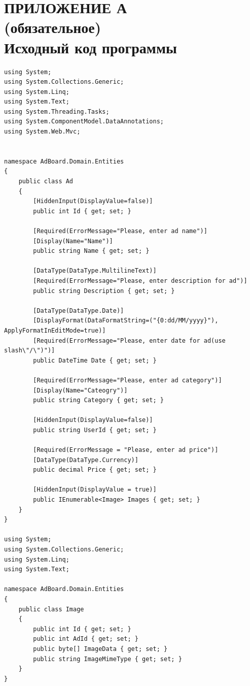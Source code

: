 \documentclass[14pt,a4paper]{extreport}
\begin{document}
	\lstset{style=sharpc}

	\newpage
	\section*{\center\normalsize ПРИЛОЖЕНИЕ А\\(обязательное)\\Исходный код программы \endcenter}
	\begin{lstlisting}
using System;
using System.Collections.Generic;
using System.Linq;
using System.Text;
using System.Threading.Tasks;
using System.ComponentModel.DataAnnotations;
using System.Web.Mvc;


namespace AdBoard.Domain.Entities
{
    public class Ad
    {
        [HiddenInput(DisplayValue=false)]
        public int Id { get; set; }
        
        [Required(ErrorMessage="Please, enter ad name")]
        [Display(Name="Name")]
        public string Name { get; set; }

        [DataType(DataType.MultilineText)]
        [Required(ErrorMessage="Please, enter description for ad")]
        public string Description { get; set; }
        
        [DataType(DataType.Date)]
        [DisplayFormat(DataFormatString=("{0:dd/MM/yyyy}"), ApplyFormatInEditMode=true)]
        [Required(ErrorMessage="Please, enter date for ad(use slash\"/\")")]
        public DateTime Date { get; set; }

        [Required(ErrorMessage="Please, enter ad category")]
        [Display(Name="Cateogry")]
        public string Category { get; set; }

        [HiddenInput(DisplayValue=false)]
        public string UserId { get; set; }

        [Required(ErrorMessage = "Please, enter ad price")]
        [DataType(DataType.Currency)]
        public decimal Price { get; set; }

        [HiddenInput(DisplayValue = true)]
        public IEnumerable<Image> Images { get; set; }
    }
}

using System;
using System.Collections.Generic;
using System.Linq;
using System.Text;

namespace AdBoard.Domain.Entities
{
    public class Image
    {
        public int Id { get; set; }
        public int AdId { get; set; }
        public byte[] ImageData { get; set; }
        public string ImageMimeType { get; set; }
    }
}


\end{lstlisting}
\end{document}
